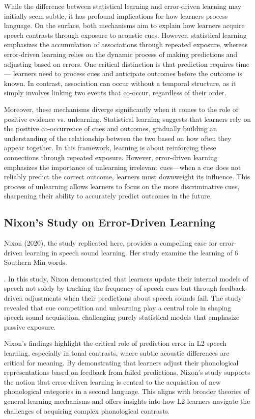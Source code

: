 While the difference between statistical learning and error-driven learning may initially seem subtle, it has profound implications for how learners process language. On the surface, both mechanisms aim to explain how learners acquire speech contrasts through exposure to acoustic cues. However, statistical learning emphasizes the accumulation of associations through repeated exposure, whereas error-driven learning relies on the dynamic process of making predictions and adjusting based on errors. One critical distinction is that prediction requires time— learners need to process cues and anticipate outcomes before the outcome is known. In contrast, association can occur without a temporal structure, as it simply involves linking two events that co-occur, regardless of their order.

Moreover, these mechanisms diverge significantly when it comes to the role of positive evidence vs. unlearning. Statistical learning suggests that learners rely on the positive co-occurrence of cues and outcomes, gradually building an understanding of the relationship between the two based on how often they appear together. In this framework, learning is about reinforcing these connections through repeated exposure. However, error-driven learning emphasizes the importance of unlearning irrelevant cues—when a cue does not reliably predict the correct outcome, learners must downweight its influence. This process of unlearning allows learners to focus on the more discriminative cues, sharpening their ability to accurately predict outcomes in the future.

\subsection{Nixon’s Study on Error-Driven Learning}

Nixon (2020), the study replicated here, provides a compelling case for error-driven learning in speech sound learning. Her study examine the learning of 6 Southern Min words. 

. In this study, Nixon demonstrated that learners update their internal models of speech not solely by tracking the frequency of speech cues but through feedback-driven adjustments when their predictions about speech sounds fail. The study revealed that cue competition and unlearning play a central role in shaping speech sound acquisition, challenging purely statistical models that emphasize passive exposure.

Nixon's findings highlight the critical role of prediction error in L2 speech learning, especially in tonal contrasts, where subtle acoustic differences are critical for meaning. By demonstrating that learners adjust their phonological representations based on feedback from failed predictions, Nixon's study supports the notion that error-driven learning is central to the acquisition of new phonological categories in a second language. This aligns with broader theories of general learning mechanisms and offers insights into how L2 learners navigate the challenges of acquiring complex phonological contrasts.


